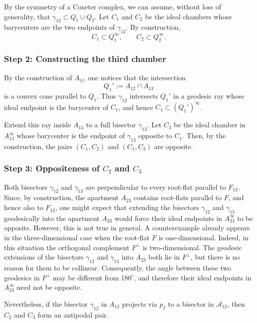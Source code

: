 \documentclass[11pt]{amsart}
\theoremstyle{plain}
\theoremstyle{definition}
\theoremstyle{remark}
\begin{document}
	By the symmetry of a Coxeter complex, we can assume, without loss of generality, that \(\gamma_{12} \subset Q_1 \cup Q_2\).  
	Let \(C_1\) and \(C_2\) be the ideal chambers whose barycenters are the two 
	endpoints of \(\gamma_{12}\).  
	By construction,
	\[
	C_1 \subset Q_1^\infty,
	\qquad
	C_2 \subset Q_2^\infty.
	\]
	
	\subsubsection*{Step 2: Constructing the third chamber}
	By the construction of $A_{ij}$, one notices that the intersection
	\[
	Q_1' := A_{12} \cap A_{13}
	\]
	is a convex cone parallel to \(Q_1\).  
	Thus \(\gamma_{12}\) intersects \(Q_1'\) in a geodesic ray whose ideal endpoint 
	is the barycenter of \(C_1\), and hence \(C_1 \subset (Q_1')^\infty\).
	
	Extend this ray inside \(A_{13}\) to a full bisector \(\gamma_{13}\).  
	Let \(C_3\) be the ideal chamber in \(A_{13}^\infty\) whose barycenter is the 
	endpoint of \(\gamma_{13}\) opposite to \(C_1\).  
	Then, by the construction, the pairs \((C_1,C_2)\) and \((C_1,C_3)\) are opposite.
	
	\subsubsection*{Step 3: Oppositeness of \texorpdfstring{$C_{2}$}{C2} and \texorpdfstring{$C_{3}$}{C3}}
	
	Both bisectors $\gamma_{12}$ and $\gamma_{13}$ are perpendicular to every root-flat parallel to $F_{12}$.  
	Since, by construction, the apartment $A_{23}$ contains root-flats parallel to $F$, and hence also to $F_{12}$, one might expect that extending the bisectors $\gamma_{12}$ and $\gamma_{13}$ geodesically into the apartment $A_{23}$ would force their ideal endpoints in $A_{23}^{\infty}$ to be opposite. However, this is not true in general. A counterexample already appears in the three-dimensional case when the root-flat $F$ is one-dimensional. Indeed, in this situation the orthogonal complement $F^\perp$ is two-dimensional. The geodesic extensions of the bisectors $\gamma_{12}$ and $\gamma_{13}$ into $A_{23}$ both lie in $F^\perp$, but there is no reason for them to be collinear. Consequently, the angle between these two geodesics in $F^\perp$ may be different from $180^\circ$, and therefore their ideal endpoints in $A_{23}^{\infty}$ need not be opposite.
	
	Nevertheless, if the bisector $\gamma_{12}$ in $A_{12}$ projects via $p_{I}$ to a bisector in $\mathcal{A}_{12}$, then $C_{2}$ and $C_{3}$ form an antipodal pair.
	
\end{document}
